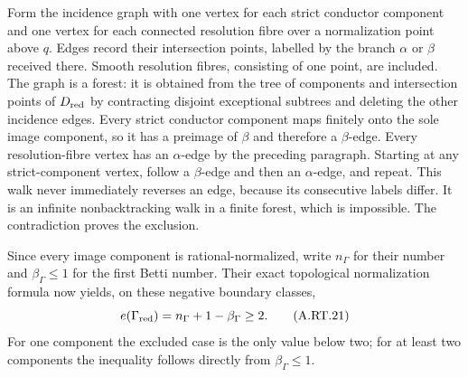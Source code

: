Form the incidence graph with one vertex for each strict
conductor component and one vertex for each connected
resolution fibre over a normalization point above $q$.
Edges record their intersection points, labelled by the
branch $\alpha$ or $\beta$ received there. Smooth resolution
fibres, consisting of one point, are included. The graph is
a forest: it is obtained from the tree of components and
intersection points of $D_{\rm red}$ by contracting disjoint
exceptional subtrees and deleting the other incidence edges.
Every strict conductor component maps finitely onto the sole
image component, so it has a preimage of $\beta$ and therefore
a $\beta$-edge. Every resolution-fibre vertex has an
$\alpha$-edge by the preceding paragraph. Starting at any
strict-component vertex, follow a $\beta$-edge and then an
$\alpha$-edge, and repeat. This walk never immediately reverses
an edge, because its consecutive labels differ. It is an
infinite nonbacktracking walk in a finite forest, which is
impossible. The contradiction proves the exclusion.

Since every image component is rational-normalized, write
$n_\Gamma$ for their number and $\beta_\Gamma\le1$ for the
first Betti number. Their exact topological normalization
formula now yields, on these negative boundary classes,
\[
 e(\Gamma_{\rm red})=n_\Gamma+1-\beta_\Gamma\ge2.
 \tag{A.RT.21}
\]
For one component the excluded case is the only value below
two; for at least two components the inequality follows
directly from $\beta_\Gamma\le1$.

